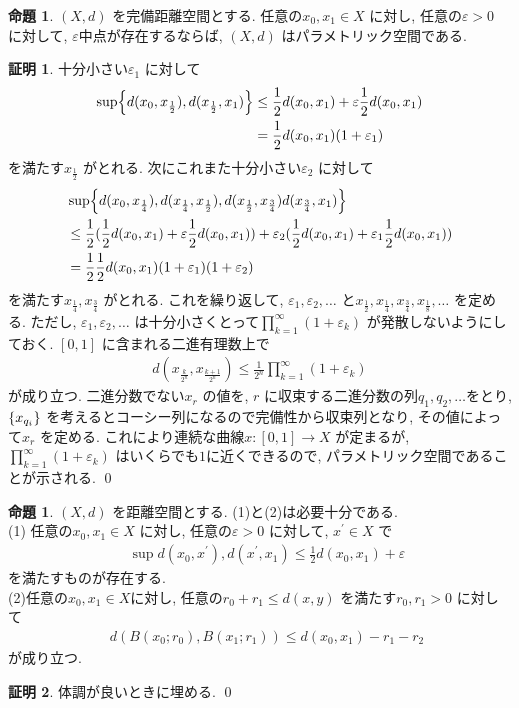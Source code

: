 \documentclass[10pt, fleqn, label-section=none]{bxjsarticle}
\theoremstyle{definition}
\newtheorem{prop}[dfn]{命題}
\newtheorem*{pf*}{証明}
\newcommand{\veps}{\varepsilon}
\newcommand{\cbra}[1]{\mleft\{#1\mright\}}
\renewcommand{\;}{\, ; \,}
\begin{document}
\begin{prop}$(X, d)$ を完備距離空間とする. 任意の$x_0, x_1 \in X$ に対し, 任意の$\veps > 0$ に対して, $\veps$中点が存在するならば, $(X, d)$ はパラメトリック空間である. 
\end{prop}
\begin{pf*}
十分小さい$\veps_1$ に対して
\begin{align*}  \sup \cbra{ d(x_0 ,  x_{\frac{1}{2}}     ) , d(x_{\frac{1}{2}}  , x_1)}    & \leq \frac{1}{2} d(x_0, x_1) + \veps \frac{1}{2} d(x_0, x_1)  \\
&= \frac{1}{2} d(x_0, x_1)  (1 + \veps_1) \end{align*}
を満たす$x_{\frac{1}{2}} $ がとれる. 次にこれまた十分小さい$\veps_2$ に対して
\begin{align*} & \sup \cbra{ d(x_0 ,  x_{\frac{1}{4}} ) , d(x_{\frac{1}{4}}, x_{\frac{1}{2}}  ), d(x_{\frac{1}{2}}, x_{\frac{3}{4}} ) d(x_{\frac{3}{4}}  , x_1)}     \\
& \leq \frac{1}{2}( \frac{1}{2} d(x_0, x_1)  + \veps \frac{1}{2}d(x_0, x_1)  ) + \veps_2 (\frac{1}{2} d(x_0, x_1)  + \veps_1 \frac{1}{2} d(x_0, x_1) ) \\
&= \frac{1}{2}\frac{1}{2} d(x_0, x_1)  (1 + \veps _1) (1 + \veps_2) \end{align*}
を満たす$x_{\frac{1}{4}} , x_{\frac{3}{4}}$ がとれる. これを繰り返して, $\veps_1, \veps_2, \ldots $ と$x_{\frac{1}{2}} , x_{\frac{1}{4}}, x_{\frac{3}{4}}, x_{\frac{1}{8}} , \ldots   $ を定める. ただし, $\veps_1, \veps_2, \ldots $ は十分小さくとって$\prod _{k = 1}^\infty (1 + \veps_k) $ が発散しないようにしておく. 
$[0, 1]$ に含まれる二進有理数上で
\begin{align*} d(x_{\frac{k}{2^n}} , x_{\frac{k + 1}{2^n} } ) \leq \frac{1}{2^n} \prod _{k = 1}^\infty (1 + \veps_k) \end{align*}
が成り立つ. 二進分数でない$x_r$ の値を, $r$ に収束する二進分数の列$q_1, q_2, \ldots $をとり, $\cbra{x_{q_i}}$ を考えるとコーシー列になるので完備性から収束列となり, その値によって$x_r$ を定める. これにより連続な曲線$x: [0,1] \rightarrow X$ が定まるが,  $\prod _{k = 1}^\infty (1 + \veps_k) $ はいくらでも$1$に近くできるので, パラメトリック空間であることが示される. 
\qed
\end{pf*}



\begin{prop}
$(X, d)$ を距離空間とする. (1)と(2)は必要十分である.\\
(1) 任意の$x_0, x_1 \in X$ に対し, 任意の$\veps > 0$ に対して, $x^\prime \in X$ で
\begin{align*} \quad  \sup{ d(x_0 ,  x^\prime) , d(x^\prime , x_1)} \leq \frac{1}{2} d(x_0, x_1) + \veps \end{align*}
 を満たすものが存在する.  \\
 (2)任意の$x_0, x_1 \in X$に対し, 任意の$r_0 + r_1 \leq d(x,y)$ を満たす$r_0 , r_1 > 0$ に対して
 \begin{align*} \quad d(B(x_0; r_0), B(x_1 ; r_1)) \leq d(x_0, x_1) - r_1 - r_2\end{align*}
 が成り立つ. 
\end{prop}
\begin{pf*}
体調が良いときに埋める. 
\qed
\end{pf*}
\end{document}
